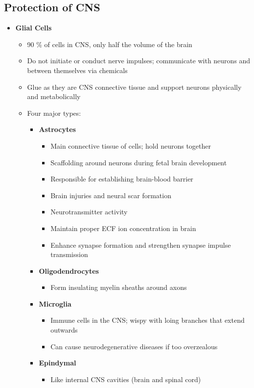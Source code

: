 \documentclass[11pt]{article}
\begin{document}
\subsection{Protection of CNS}
\begin{itemize}
\item\textbf{Glial Cells}
\begin{itemize}
\item 90 \% of cells in CNS, only half the volume of the brain
\item Do not initiate or conduct nerve impulses; communicate with neurons and between themselves via chemicals
\item Glue as they are CNS connective tissue and support neurons physically and metabolically
\item Four major types:
\begin{itemize}
\item \textbf{Astrocytes}
\begin{itemize}
\item Main connective tissue of cells; hold neurons together
\item Scaffolding around neurons during fetal brain development
\item Responsible for establishing brain-blood barrier
\item Brain injuries and neural scar formation
\item Neurotransmitter activity
\item Maintain proper ECF ion concentration in brain
\item Enhance synapse formation and strengthen synapse impulse transmission
\end{itemize}
\item \textbf{Oligodendrocytes}
\begin{itemize}
\item Form insulating myelin sheaths around axons
\end{itemize}
\item \textbf{Microglia}
\begin{itemize}
\item Immune cells in the CNS; wispy with loing branches that extend outwards
\item Can cause neurodegenerative diseases if too overzealous
\end{itemize}
\item \textbf{Epindymal}
\begin{itemize}
\item Like internal CNS cavities (brain and spinal cord) 

\end{itemize}
\end{itemize}
\end{itemize}
\end{itemize}
\end{document}
